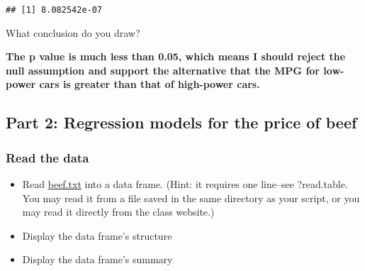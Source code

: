 \documentclass[]{article}
\newenvironment{Shaded}{\begin{snugshade}}{\end{snugshade}}
\newcommand{\KeywordTok}[1]{\textcolor[rgb]{0.13,0.29,0.53}{\textbf{#1}}}
\newcommand{\DataTypeTok}[1]{\textcolor[rgb]{0.13,0.29,0.53}{#1}}
\newcommand{\StringTok}[1]{\textcolor[rgb]{0.31,0.60,0.02}{#1}}
\newcommand{\OperatorTok}[1]{\textcolor[rgb]{0.81,0.36,0.00}{\textbf{#1}}}
\newcommand{\NormalTok}[1]{#1}
\providecommand{\tightlist}{%
  \setlength{\itemsep}{0pt}\setlength{\parskip}{0pt}}
\begin{document}
\begin{Shaded}
\end{Shaded}

\begin{verbatim}
## [1] 8.082542e-07
\end{verbatim}

What conclusion do you draw?

\textbf{The p value is much less than 0.05, which means I should reject
the null assumption and support the alternative that the MPG for
low-power cars is greater than that of high-power cars.}

\subsection{Part 2: Regression models for the price of
beef}\label{part-2-regression-models-for-the-price-of-beef}

\subsubsection{Read the data}\label{read-the-data}

\begin{itemize}
\tightlist
\item
  Read \url{beef.txt} into a data frame. (Hint: it requires one
  line--see ?read.table. You may read it from a file saved in the same
  directory as your script, or you may read it directly from the class
  website.)
\item
  Display the data frame's structure
\item
  Display the data frame's summary
\end{itemize}

\begin{Shaded}
\end{Shaded}
\end{document}
